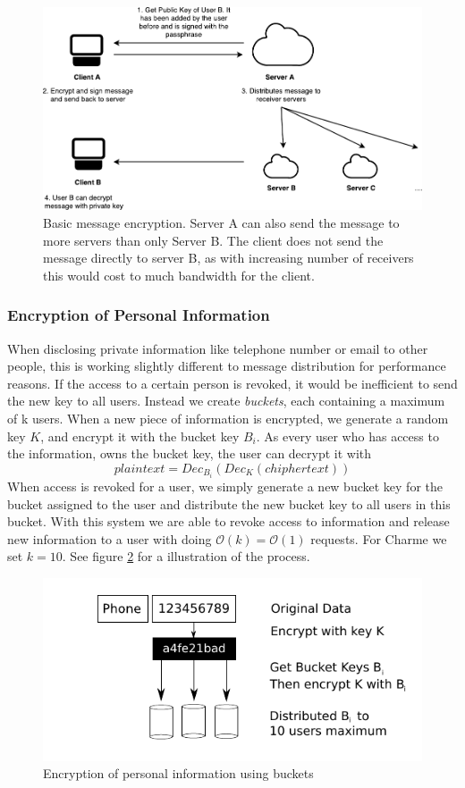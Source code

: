 \documentclass{scrartcl}
\begin{document}
 \begin{figure}[ht]
	\centering
  \includegraphics[width=120mm]{pubkey.pdf}
	\caption{Basic message encryption. Server A can also send the message to more servers than only Server B. The client does not send the message directly to server B, as with increasing number of receivers this would cost to much bandwidth for the client.}
	\label{fig2}
\end{figure}


  \subsubsection{Encryption of Personal Information}
  When disclosing private information like telephone number or email to other people, this is working slightly different to message distribution for performance reasons.  If the access to a certain person is revoked, it would be inefficient to send the new key to all users. Instead we create  \textit{buckets}, each containing a maximum of k users. When a new piece of information is encrypted, we generate a random key $K$, and encrypt it with the bucket key $B_i$. As every user who has access to the information, owns the bucket key, the user can decrypt it with
  $$
  plaintext = Dec_{B_i}({Dec_K(chiphertext)})
  $$
  When access is revoked for a user, we simply generate a new bucket key for the bucket assigned to the user and distribute the new bucket key to all users in this bucket. With this system we are able to revoke access to information and release new information to a user with doing $\mathcal O(k) = \mathcal O(1)$ requests. For Charme we set $k = 10$. See figure \ref{fig3} for a illustration of the process.
  
  
   \begin{figure}[ht]
	\centering
  \includegraphics[]{prvInfo.pdf}
	\caption{Encryption of personal information using buckets}
	\label{fig3}
\end{figure}
\end{document}
